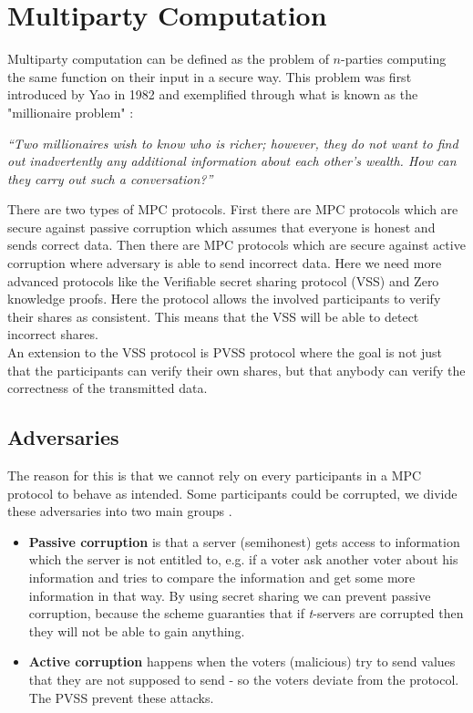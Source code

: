 \section{Multiparty Computation}
Multiparty computation can be defined as the problem of $n$-parties computing the same function on their input in a secure way.  This problem was first introduced by Yao in 1982 and exemplified through what is known as the "millionaire problem" \cite{Yao82}:

\begin{center}
\textit{“Two millionaires wish to know who is richer; however, they do not want to find out inadvertently any additional information about each other’s wealth. How can they carry out such a conversation?”}
\end{center}

\noindent
There are two types of MPC protocols. First there are MPC protocols which are secure against passive corruption which assumes that everyone is honest and sends correct data. Then there are MPC protocols which are secure against active corruption where adversary is able to send incorrect data. Here we need more advanced protocols like the Verifiable secret sharing protocol (VSS) and Zero knowledge proofs. Here the protocol allows the involved participants to verify their shares as consistent. This means that the VSS will be able to detect incorrect shares. \\



\noindent
An extension to the VSS protocol is PVSS protocol where the goal is not just that the participants can verify their own shares, but that anybody can verify the correctness of the transmitted data. 

\subsection{Adversaries}
The reason for this is that we cannot rely on every participants in a MPC protocol to behave as intended. Some participants could be corrupted, we divide these adversaries into two main groups \cite{IntroCrypto}. 

\begin{itemize}
\item \textbf{Passive corruption} is that a server (semihonest) gets access to information which the server is not entitled to, e.g. if a voter ask another voter about his information and tries to compare the information and get some more information in that way. By using secret sharing we can prevent passive corruption, because the scheme guaranties that if \textit{t}-servers are corrupted then they will not be able to gain anything.

\item \textbf{Active corruption} happens when the voters (malicious) try to send values that they are not supposed to send - so the voters deviate from the protocol. The PVSS prevent these attacks.
\end{itemize}
